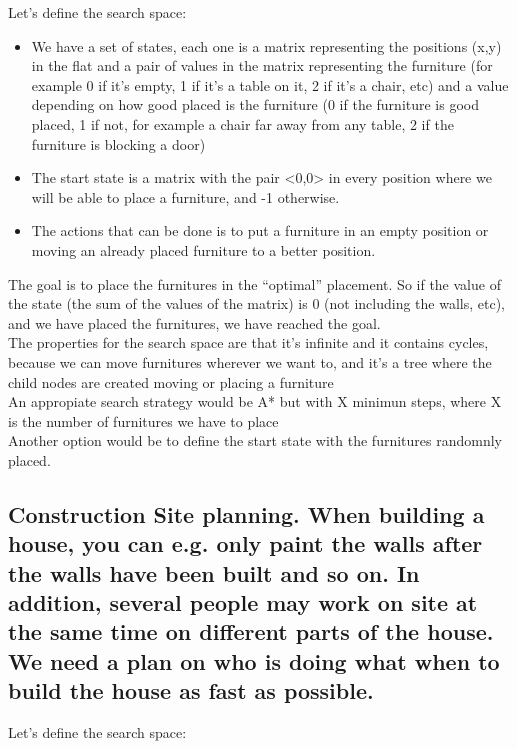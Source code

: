 \documentclass[paper=a4, fontsize=11pt]{scrartcl} %
\numberwithin{equation}{section} %
\numberwithin{figure}{section} %
\numberwithin{table}{section} %
\begin{document}
Let's define the search space:

\begin{itemize}
	\item We have a set of states, each one is a matrix representing the positions (x,y)  in the flat and a pair of values in the matrix representing the furniture (for example 0 if it's empty, 1 if it's a table on it, 2 if it's a chair, etc) and a value depending on how good placed is the furniture (0 if the furniture is good placed, 1 if not, for example a chair far away from any table, 2 if the furniture is blocking a door)
	\item The start state is a matrix with the pair <0,0> in every position where we will be able to place a furniture, and -1 otherwise.
	\item The actions that can be done is to put a furniture in an empty position or moving an already placed furniture to a better position.
\end{itemize}
The goal is to place the furnitures in the “optimal” placement. So if the value of the state (the sum of the values of the matrix) is 0 (not including the walls, etc), and we have placed the furnitures, we have reached the goal.\\

The properties for the search space are that it's infinite and it contains cycles, because we can move furnitures wherever we want to, and it's a tree where the child nodes are created moving or placing a furniture\\

An appropiate search strategy would be A* but with X minimun steps, where X is the number of furnitures we have to place\\

Another option would be to define the start state with the furnitures randomnly placed.

\newpage

\subsection{Construction Site planning. When building a house, you can e.g. only paint the walls after the walls have been built and so on. In addition, several people may work on site at the same time on different parts of the house. We need a plan on who is doing what when to build the house as fast as possible.}

Let's define the search space:
\end{document}

